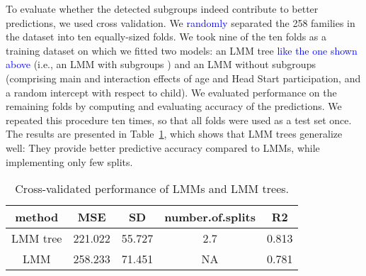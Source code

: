 \documentclass[doc,floatsintext,natbib]{apa7}
\newcommand{\edc}[1]{\textcolor{blue}{#1}}
\begin{document}
To evaluate whether the detected subgroups indeed contribute to better predictions, we used cross validation. We \edc{randomly} separated the 258 families in the dataset into ten equally-sized folds. We took nine of the ten folds as a training dataset on which we fitted two models: an LMM tree \edc{like the one shown above} (i.e., an LMM with subgroups ) and an LMM without subgroups (comprising main and interaction effects of age and Head Start participation, and a random intercept with respect to child). We evaluated performance on the remaining folds by computing and evaluating accuracy of the predictions.  We repeated this procedure ten times, so that all folds were used as a test set once. The results are presented in Table~\ref{tab:performance}, which shows that LMM trees generalize well: They provide better predictive accuracy compared to LMMs, while implementing only few splits. 





\begin{table}

\caption{\label{tab:performance}Cross-validated performance of LMMs and LMM trees.}
\begin{tabular}[t]{ccccc}
\toprule
method & MSE & SD & number.of.splits & R2\\
\midrule
LMM tree & 221.022 & 55.727 & 2.7 & 0.813\\
LMM & 258.233 & 71.451 & NA & 0.781\\
\bottomrule
\end{tabular}
\end{table}





\newpage
\FloatBarrier
\end{document}
